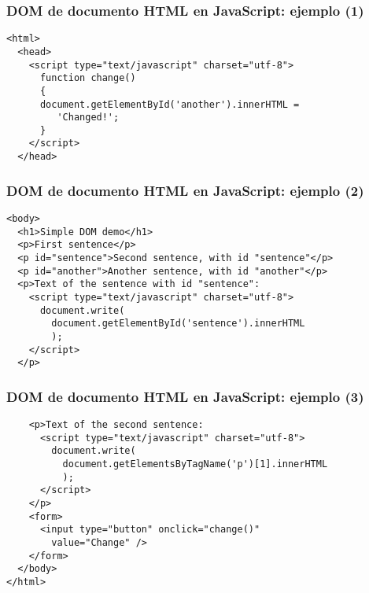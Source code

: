 \begin{frame}[fragile]
\frametitle{DOM de documento HTML en JavaScript: ejemplo (1)}

\begin{verbatim}
<html>
  <head>
    <script type="text/javascript" charset="utf-8">
      function change()
      {
      document.getElementById('another').innerHTML =
         'Changed!';
      }
    </script>
  </head>
\end{verbatim}
\end{frame}


\begin{frame}[fragile]
\frametitle{DOM de documento HTML en JavaScript: ejemplo (2)}

\begin{verbatim}
<body>
  <h1>Simple DOM demo</h1>
  <p>First sentence</p>
  <p id="sentence">Second sentence, with id "sentence"</p>
  <p id="another">Another sentence, with id "another"</p>
  <p>Text of the sentence with id "sentence":
    <script type="text/javascript" charset="utf-8">
      document.write(
        document.getElementById('sentence').innerHTML
        );
    </script>
  </p>
\end{verbatim}
\end{frame}


\begin{frame}[fragile]
\frametitle{DOM de documento HTML en JavaScript: ejemplo (3)}

\begin{verbatim}
    <p>Text of the second sentence:
      <script type="text/javascript" charset="utf-8">
        document.write(
          document.getElementsByTagName('p')[1].innerHTML
          );
      </script>
    </p>
    <form>
      <input type="button" onclick="change()"
        value="Change" />
    </form>
  </body>
</html>
\end{verbatim}
\end{frame}


